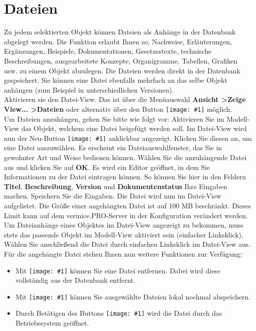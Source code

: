 \documentclass[a4paper,10pt]{book}
\newcommand{\icon}[1]{\texttt{[image: \#1]}}
\begin{document}
\section{Dateien} \label{Dateien}
Zu jedem selektierten Objekt können Dateien als Anhänge in der Datenbank abgelegt werden. Die Funktion erlaubt Ihnen so, Nachweise,
Erläuterungen, Ergänzungen, Beispiele, Dokumentationen, Gesetzestexte, technische Beschreibungen, ausgearbeitete Konzepte, Organigramme,
Tabellen, Grafiken usw. zu einem Objekt abzulegen. Die Dateien werden direkt in der Datenbank gespeichert. Sie können eine Datei ebenfalls
mehrfach an das selbe Objekt anhängen (zum Beispiel in unterschiedlichen Versionen).
\newline\\
Aktivieren sie den Datei-View. Das ist über die Menüauswahl \textbf{Ansicht \textgreater Zeige View... \textgreater Dateien} oder alternativ
über den Button \icon{Icon/Hinzufuegen.png} möglich.
\newline\\
Um Dateien anzuhängen, gehen Sie bitte wie folgt vor: Aktivieren Sie im Modell-View das Objekt, welchem eine Datei beigefügt werden soll.
Im Datei-View wird nun der Neu-Button \icon{Icon/Oeffnen.png} anklickbar angezeigt. Klicken Sie diesen an, um eine Datei auszuwählen. Es erscheint ein
Dateiauswahlfenster, das Sie in gewohnter Art und Weise bedienen können. Wählen Sie die anzuhängende Datei aus und klicken Sie auf \textbf{OK}.
Es wird ein Editor geöffnet, in dem Sie Informationen zu der Datei eintragen können. So können Sie hier in den Feldern \textbf{Titel}, \textbf{Beschreibung},
\textbf{Version} und \textbf{Dokumentenstatus} Ihre Eingaben machen. Speichern Sie die Eingaben. Die Datei wird nun im Datei-View aufgelistet. Die Größe einer angehängten Datei ist auf 100 MB beschränkt. Dieses Limit kann auf dem verinice.PRO-Server in der Konfiguration verändert werden.
\newline\\
Um Dateianhänge eines Objektes im Datei-View angezeigt zu bekommen, muss stets das passende Objekt im Modell-View aktiviert sein (einfacher Linksklick). Wählen Sie anschließend die Datei durch einfachen Linksklick im Datei-View aus. Für die angehängte Datei stehen Ihnen nun weitere Funktionen zur Verfügung:
\begin{itemize}
 \item Mit \icon{Icon/Delete.png} können Sie eine Datei entfernen. Dabei wird diese vollständig aus der Datenbank entfernt.
 \item Mit \icon{Icon/Save.png} können Sie ausgewählte Dateien lokal nochmal abspeichern.
 \item Durch Betätigen des Buttons \icon{Icon/Suchen.png} wird die Datei durch das Betriebssystem geöffnet.
\end{itemize}
\end{document}
